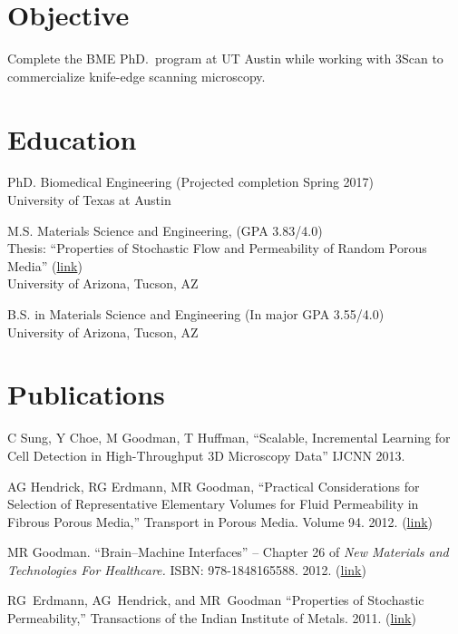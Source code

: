 \documentclass{res}
\begin{document}
\begin{resume} 
 
\section{Objective} 
Complete the BME PhD.~program at UT Austin while working with 3Scan to
commercialize knife-edge scanning microscopy.

\section{Education} 
PhD. Biomedical Engineering (Projected completion Spring 2017) \\
University of Texas at Austin

M.S. Materials Science and Engineering, 
(GPA 3.83/4.0) \\
Thesis: ``Properties of Stochastic Flow and Permeability of Random Porous Media'' 
  (\href{http://hdl.handle.net/10150/193422}{link})  \\
University of Arizona, Tucson, AZ 

B.S. in Materials Science and Engineering (In major GPA 3.55/4.0) \\
University of Arizona, Tucson, AZ 

\section{Publications}
  C Sung, Y Choe, M Goodman, T Huffman, 
  ``Scalable, Incremental Learning for Cell Detection in High-Throughput 3D Microscopy Data''
  IJCNN 2013.

  AG Hendrick, RG Erdmann, MR Goodman, 
  ``Practical Considerations for Selection of Representative
  Elementary Volumes for Fluid Permeability in Fibrous
  Porous Media,'' Transport in Porous Media.  Volume 94.  2012. 
  (\href{http://dx.doi.org/10.1007/s11242-012-0051-8}{link})

  MR Goodman. ``Brain--Machine Interfaces'' -- Chapter 26 of \textit{New Materials and Technologies For Healthcare.} ISBN: 978-1848165588. 2012.
  (\href{http://amzn.com/1848165587}{link})

  RG~Erdmann, AG~Hendrick, and MR~Goodman
  ``Properties of Stochastic Permeability,'' 
  Transactions of the Indian Institute of Metals. 2011. 
  (\href{http://dx.doi.org/10.1007/s12666-009-0038-5}{link})


\end{resume}
\end{document}
